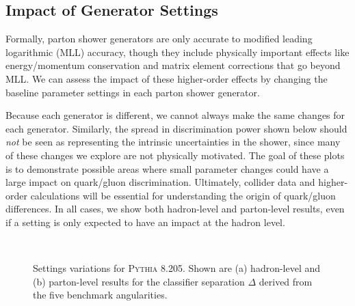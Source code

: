 \documentclass[11pt]{cernrep}
\begin{document}
\subsection{Impact of Generator Settings}
\label{quarkgluon_sec:ee_settings}

Formally, parton shower generators are only accurate to modified leading logarithmic (MLL) accuracy, though they include physically important effects like energy/momentum conservation and matrix element corrections that go beyond MLL.  We can assess the impact of these higher-order effects by changing the baseline parameter settings in each parton shower generator.  

Because each generator is different, we cannot always make the same changes for each generator.  Similarly, the spread in discrimination power shown below should \emph{not} be seen as representing the intrinsic uncertainties in the shower, since many of these changes we explore are not physically motivated.  The goal of these plots is to demonstrate possible areas where small parameter changes could have a large impact on quark/gluon discrimination.  Ultimately, collider data and higher-order calculations will be essential for understanding the origin of quark/gluon differences.  In all cases, we show both hadron-level and parton-level results, even if a setting is only expected to have an impact at the hadron level.  

\begin{figure}
\centering
{}
$\qquad$
\caption{Settings variations for \textsc{Pythia 8.205}.  Shown are (a) hadron-level and (b) parton-level results for the classifier separation $\Delta$ derived from the five benchmark angularities.}
\label{quarkgluon_fig:settings_variation_pythia}
\end{figure}
\end{document}
